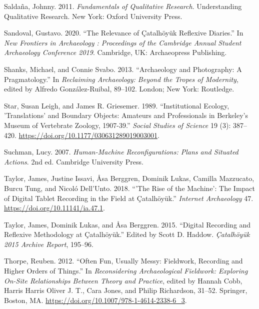 \documentclass[
]{article}
\newlength{\cslhangindent}
\newenvironment{CSLReferences}[2] %
 {\begin{list}{}{%
  \setlength{\itemindent}{0pt}
  \setlength{\leftmargin}{0pt}
  \setlength{\parsep}{0pt}
  \ifodd #1
   \setlength{\leftmargin}{\cslhangindent}
   \setlength{\itemindent}{-1\cslhangindent}
  \fi
  \setlength{\itemsep}{#2\baselineskip}}}
 {\end{list}}
\begin{document}
\begin{CSLReferences}{1}{0}
Saldaña, Johnny. 2011. \emph{Fundamentals of Qualitative Research}.
Understanding Qualitative Research. New York: Oxford University Press.

Sandoval, Gustavo. 2020. {``The {Relevance} of {Çatalhöyük Reflexive
Diaries}.''} In \emph{New {Frontiers} in {Archaeology} : {Proceedings}
of the {Cambridge Annual Student Archaeology Conference} 2019}.
Cambridge, UK: Archaeopress Publishing.

Shanks, Michael, and Connie Svabo. 2013. {``Archaeology and Photography:
{A} Pragmatology.''} In \emph{Reclaiming {Archaeology}: {Beyond} the
{Tropes} of {Modernity}}, edited by Alfredo González-Ruibal, 89--102.
London; New York: Routledge.

Star, Susan Leigh, and James R. Griesemer. 1989. {``Institutional
{Ecology}, '{Translations}' and {Boundary Objects}: {Amateurs} and
{Professionals} in {Berkeley}'s {Museum} of {Vertebrate Zoology},
1907-39.''} \emph{Social Studies of Science} 19 (3): 387--420.
\url{https://doi.org/10.1177/030631289019003001}.

Suchman, Lucy. 2007. \emph{Human-Machine Reconfigurations: Plans and
Situated Actions}. 2nd ed. Cambridge University Press.

Taylor, James, Justine Issavi, Åsa Berggren, Dominik Lukas, Camilla
Mazzucato, Burcu Tung, and Nicoló Dell'Unto. 2018. {``'{The Rise} of the
{Machine}': The Impact of Digital Tablet Recording in the Field at
{Çatalhöyük}.''} \emph{Internet Archaeology} 47.
\url{https://doi.org/10.11141/ia.47.1}.

Taylor, James, Dominik Lukas, and Åsa Berggren. 2015. {``Digital
Recording and Reflexive Methodology at {Çatalhöyük}.''} Edited by Scott
D. Haddow. \emph{Çatalhöyük 2015 Archive Report}, 195--96.

Thorpe, Reuben. 2012. {``Often {Fun}, {Usually Messy}: {Fieldwork},
{Recording} and {Higher Orders} of {Things}.''} In \emph{Reconsidering
{Archaeological Fieldwork}: {Exploring On-Site Relationships Between
Theory} and {Practice}}, edited by Hannah Cobb, Harris Harris Oliver J.
T., Cara Jones, and Philip Richardson, 31--52. Springer, Boston, MA.
\url{https://doi.org/10.1007/978-1-4614-2338-6_3}.


\end{CSLReferences}
\end{document}
